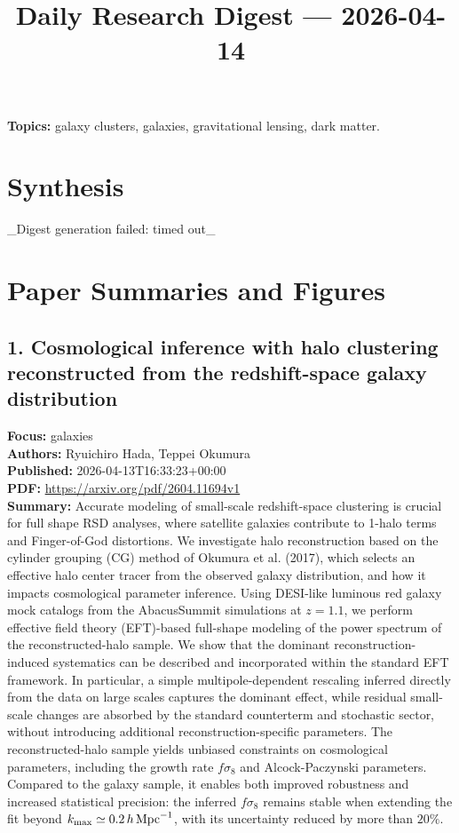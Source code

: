 \documentclass[11pt]{article}
\begin{document}
\title{Daily Research Digest --- 2026-04-14}
\author{}
\date{}
\maketitle
\textbf{Topics:} galaxy clusters, galaxies, gravitational lensing, dark matter.
\section*{Synthesis}
\_Digest generation failed: timed out\_
\newpage
\section*{Paper Summaries and Figures}
\subsection*{1. Cosmological inference with halo clustering reconstructed from the redshift-space galaxy distribution}
\textbf{Focus:} galaxies\\
\textbf{Authors:} Ryuichiro Hada, Teppei Okumura\\
\textbf{Published:} 2026-04-13T16:33:23+00:00\\
\textbf{PDF:} \href{https://arxiv.org/pdf/2604.11694v1}{https://arxiv.org/pdf/2604.11694v1}\\
\textbf{Summary:}
Accurate modeling of small-scale redshift-space clustering is crucial for full shape RSD analyses, where satellite galaxies contribute to 1-halo terms and Finger-of-God distortions. We investigate halo reconstruction based on the cylinder grouping (CG) method of Okumura et al. (2017), which selects an effective halo center tracer from the observed galaxy distribution, and how it impacts cosmological parameter inference. Using DESI-like luminous red galaxy mock catalogs from the AbacusSummit simulations at $z=1.1$, we perform effective field theory (EFT)-based full-shape modeling of the power spectrum of the reconstructed-halo sample. We show that the dominant reconstruction-induced systematics can be described and incorporated within the standard EFT framework. In particular, a simple multipole-dependent rescaling inferred directly from the data on large scales captures the dominant effect, while residual small-scale changes are absorbed by the standard counterterm and stochastic sector, without introducing additional reconstruction-specific parameters. The reconstructed-halo sample yields unbiased constraints on cosmological parameters, including the growth rate $f\sigma _8$ and Alcock-Paczynski parameters. Compared to the galaxy sample, it enables both improved robustness and increased statistical precision: the inferred $f\sigma _8$ remains stable when extending the fit beyond $k_{\max}\simeq 0.2\,h\,{\rm Mpc}^{-1}$, with its uncertainty reduced by more than $20\%$.
\newpage
\end{document}
